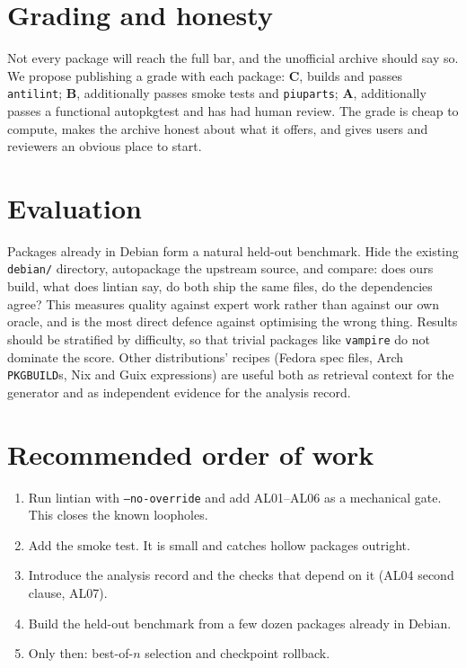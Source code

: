 \documentclass[11pt]{article}
\newcommand{\pkg}[1]{\texttt{#1}}
\newcommand{\file}[1]{\texttt{#1}}
\begin{document}
\section{Grading and honesty}

Not every package will reach the full bar, and the unofficial archive should
say so. We propose publishing a grade with each package:
\textbf{C}, builds and passes \texttt{antilint};
\textbf{B}, additionally passes smoke tests and \texttt{piuparts};
\textbf{A}, additionally passes a functional autopkgtest and has had human
review. The grade is cheap to compute, makes the archive honest about what
it offers, and gives users and reviewers an obvious place to start.

\section{Evaluation}

Packages already in Debian form a natural held-out benchmark. Hide the
existing \file{debian/} directory, autopackage the upstream source, and
compare: does ours build, what does lintian say, do both ship the same
files, do the dependencies agree? This measures quality against expert
work rather than against our own oracle, and is the most direct defence
against optimising the wrong thing. Results should be stratified by
difficulty, so that trivial packages like \pkg{vampire} do not dominate the
score. Other distributions' recipes (Fedora spec files, Arch
\texttt{PKGBUILD}s, Nix and Guix expressions) are useful both as
retrieval context for the generator and as independent evidence for the
analysis record.

\section{Recommended order of work}

\begin{enumerate}[leftmargin=1.5em]
\item Run lintian with \texttt{--no-override} and add AL01--AL06 as a
  mechanical gate. This closes the known loopholes.
\item Add the smoke test. It is small and catches hollow packages outright.
\item Introduce the analysis record and the checks that depend on it (AL04
  second clause, AL07).
\item Build the held-out benchmark from a few dozen packages already in
  Debian.
\item Only then: best-of-$n$ selection and checkpoint rollback.
\end{enumerate}
\end{document}
